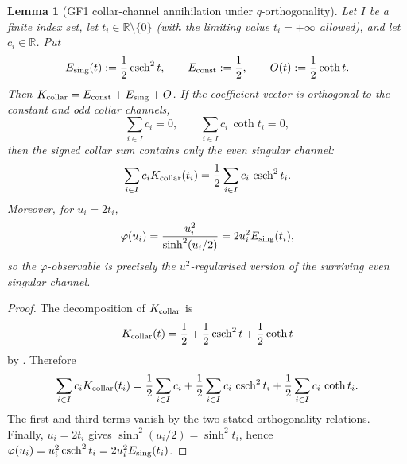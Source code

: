 \documentclass[11pt,a4paper]{article}
\newtheorem{lemma}[lemma]{Lemma}
\theoremstyle{remark}
\theoremstyle{plain}
\begin{document}
\begin{lemma}[GF1 collar-channel annihilation under \(q\)-orthogonality]
\label{lem:gf1-q-orthogonality-annihilation}
Let \(I\) be a finite index set, let
\(t_i\in\mathbb{R}\setminus\{0\}\) (with the limiting value
\(t_i=+\infty\) allowed), and let \(c_i\in\mathbb{R}\).  Put
\[
  E_{\rm sing}(t):=\frac12\operatorname{csch}^2t,
  \qquad
  E_{\rm const}:=\frac12,
  \qquad
  O(t):=\frac12\coth t .
\]
Then \(K_{\rm collar}=E_{\rm const}+E_{\rm sing}+O\).  If the
coefficient vector is orthogonal to the constant and odd collar
channels,
\[
  \sum_{i\in I}c_i=0,
  \qquad
  \sum_{i\in I}c_i\,\coth t_i=0,
\]
then the signed collar sum contains only the even singular channel:
\[
  \sum_{i\in I}c_i K_{\rm collar}(t_i)
  =\frac12\sum_{i\in I}c_i\,\operatorname{csch}^2t_i .
\]
Moreover, for \(u_i=2t_i\),
\[
  \varphi(u_i)
  =\frac{u_i^2}{\sinh^2(u_i/2)}
  =2u_i^2 E_{\rm sing}(t_i),
\]
so the \(\varphi\)-observable is precisely the \(u^2\)-regularised
version of the surviving even singular channel.
\end{lemma}

\begin{proof}
The decomposition of \(K_{\rm collar}\) is
\[
  K_{\rm collar}(t)
  =\frac12+\frac12\operatorname{csch}^2t+\frac12\coth t
\]
by .  Therefore
\[
  \sum_{i\in I}c_iK_{\rm collar}(t_i)
  =
  \frac12\sum_{i\in I}c_i
  +\frac12\sum_{i\in I}c_i\,\operatorname{csch}^2t_i
  +\frac12\sum_{i\in I}c_i\,\coth t_i .
\]
The first and third terms vanish by the two stated orthogonality
relations.  Finally, \(u_i=2t_i\) gives
\(\sinh^2(u_i/2)=\sinh^2t_i\), hence
\(\varphi(u_i)=u_i^2\operatorname{csch}^2t_i
=2u_i^2E_{\rm sing}(t_i)\).
\end{proof}
\end{document}
